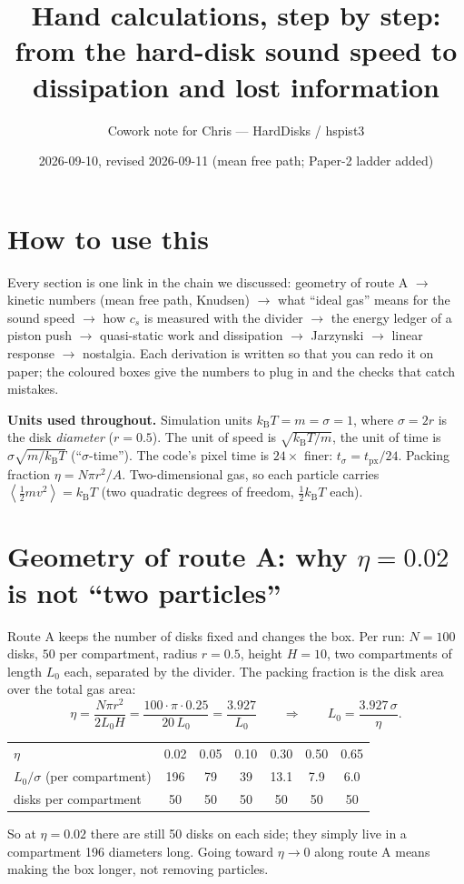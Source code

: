\documentclass[11pt,a4paper]{article}
\title{Hand calculations, step by step:\\ from the hard-disk sound speed to dissipation and lost information}
\author{Cowork note for Chris --- HardDisks / hspist3}
\date{2026-09-10, revised 2026-09-11 (mean free path; Paper-2 ladder added)}
\newcommand{\kT}{k_{\mathrm B}T}
\newcommand{\avg}[1]{\left\langle #1 \right\rangle}
\begin{document}
\maketitle

\section*{How to use this}
Every section is one link in the chain we discussed: geometry of route A $\to$ kinetic numbers (mean free path, Knudsen) $\to$ what ``ideal gas'' means for the sound speed $\to$ how $c_s$ is measured with the divider $\to$ the energy ledger of a piston push $\to$ quasi-static work and dissipation $\to$ Jarzynski $\to$ linear response $\to$ nostalgia. Each derivation is written so that you can redo it on paper; the coloured boxes give the numbers to plug in and the checks that catch mistakes.

\textbf{Units used throughout.} Simulation units $\kT = m = \sigma = 1$, where $\sigma = 2r$ is the disk \emph{diameter} ($r = 0.5$). The unit of speed is $\sqrt{\kT/m}$, the unit of time is $\sigma\sqrt{m/\kT}$ (``$\sigma$-time''). The code's pixel time is $24\times$ finer: $t_\sigma = t_{\mathrm{px}}/24$. Packing fraction $\eta = N\pi r^2/A$. Two-dimensional gas, so each particle carries $\avg{\tfrac12 m v^2} = \kT$ (two quadratic degrees of freedom, $\tfrac12\kT$ each).

\tableofcontents

\section{Geometry of route A: why \texorpdfstring{$\eta = 0.02$}{eta = 0.02} is not ``two particles''}

Route A keeps the number of disks fixed and changes the box. Per run: $N = 100$ disks, $50$ per compartment, radius $r = 0.5$, height $H = 10$, two compartments of length $L_0$ each, separated by the divider. The packing fraction is the disk area over the total gas area:
\begin{equation}
\eta = \frac{N\pi r^2}{2 L_0 H} = \frac{100\cdot\pi\cdot 0.25}{20\,L_0} = \frac{3.927}{L_0}
\qquad\Longrightarrow\qquad
L_0 = \frac{3.927\,\sigma}{\eta}.
\label{eq:L0}
\end{equation}

\begin{worked}
\begin{tabular}{@{}lcccccc@{}}
\toprule
$\eta$ & 0.02 & 0.05 & 0.10 & 0.30 & 0.50 & 0.65\\
$L_0/\sigma$ (per compartment) & 196 & 79 & 39 & 13.1 & 7.9 & 6.0\\
disks per compartment & 50 & 50 & 50 & 50 & 50 & 50\\
\bottomrule
\end{tabular}

So at $\eta = 0.02$ there are still 50 disks on each side; they simply live in a compartment 196 diameters long. Going toward $\eta \to 0$ along route A means making the box longer, not removing particles.
\end{worked}
\end{document}
